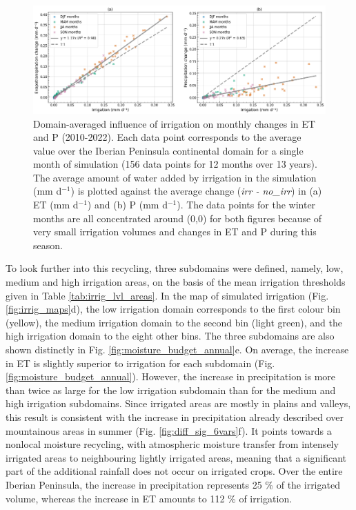 \begin{figure}[htbp]
    \centering
    \includegraphics[width=\textwidth]{images/chap4/f08_colorblind.png}
    \caption{Domain-averaged influence of irrigation on monthly changes in ET and P (2010-2022). Each data point corresponds to the average value over the Iberian Peninsula continental domain for a single month of simulation (156 data points for 12 months over 13 years). The average amount of water added by irrigation in the \irr simulation (mm d$^{-1}$) is plotted against the average change (\textit{irr - no\_irr}) in (a) ET (mm d$^{-1}$) and (b) P (mm d$^{-1}$). The data points for the winter months are all concentrated around (0,0) for both figures because of very small irrigation volumes and changes in ET and P during this season.}
    \label{fig:scatter_IP}
\end{figure}

To look further into this recycling, three subdomains were defined, namely, low, medium and high irrigation areas, on the basis of the mean irrigation thresholds given in Table \ref{tab:irrig_lvl_areas}. In the map of simulated irrigation (Fig. \ref{fig:irrig_maps}d), the low irrigation domain corresponds to the first colour bin (yellow), the medium irrigation domain to the second bin (light green), and the high irrigation domain to the eight other bins. The three subdomains are also shown distinctly in Fig. \ref{fig:moisture_budget_annual}e.
On average, the increase in ET is slightly superior to irrigation for each subdomain (Fig. \ref{fig:moisture_budget_annual}).
However, the increase in precipitation is more than twice as large for the low irrigation subdomain than for the medium and high irrigation subdomains. Since irrigated areas are mostly in plains and valleys, this result is consistent with the increase in precipitation already described over mountainous areas in summer (Fig. \ref{fig:diff_sig_6vars}f). It points towards a nonlocal moisture recycling, with atmospheric moisture transfer from intensely irrigated areas to neighbouring lightly irrigated areas, meaning that a significant part of the additional rainfall does not occur on irrigated crops.
Over the entire Iberian Peninsula, the increase in precipitation represents 25 \% of the irrigated volume, whereas the increase in ET amounts to 112 \% of irrigation.

